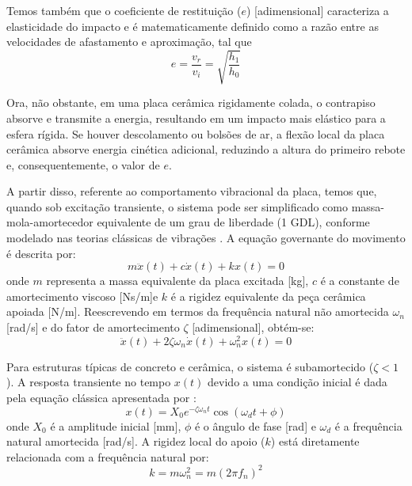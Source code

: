 \documentclass[10pt,twocolumn,fleqn]{article}
\begin{document}
	Temos também que o coeficiente de restituição ($e$) [adimensional] caracteriza a elasticidade do impacto e é matematicamente definido como a razão entre as velocidades de afastamento e aproximação, tal que
	\begin{equation}
	e = \frac{v_r}{v_i} = \sqrt{\frac{h_1}{h_0}}
	\end{equation}
	
	Ora, não obstante, em uma placa cerâmica rigidamente colada, o contrapiso absorve e transmite a energia, resultando em um impacto mais elástico para a esfera rígida. Se houver descolamento ou bolsões de ar, a flexão local da placa cerâmica absorve energia cinética adicional, reduzindo a altura do primeiro rebote e, consequentemente, o valor de $e$.
	
	A partir disso, referente ao comportamento vibracional da placa, temos que, quando sob excitação transiente, o sistema pode ser simplificado como massa-mola-amortecedor equivalente de um grau de liberdade (1 GDL), conforme modelado nas teorias clássicas de vibrações \parencite{rao2008vibracoes, thomson2008teoria}. A equação governante do movimento é descrita por:
	\begin{equation}
	m\ddot{x}(t) + c\dot{x}(t) + kx(t) = 0
	\end{equation}
	onde $m$ representa a massa equivalente da placa excitada [kg], $c$ é a constante de amortecimento viscoso [Ns/m]e $k$ é a rigidez equivalente da peça cerâmica apoiada [N/m]. Reescrevendo em termos da frequência natural não amortecida $\omega_n$ [rad/s] e do fator de amortecimento $\zeta$ [adimensional], obtém-se:
	\begin{equation}
	\ddot{x}(t) + 2\zeta\omega_n\dot{x}(t) + \omega_n^2 x(t) = 0
	\end{equation}
	
	Para estruturas típicas de concreto e cerâmica, o sistema é subamortecido ($\zeta < 1$). A resposta transiente no tempo $x(t)$ devido a uma condição inicial é dada pela equação clássica apresentada por \textcite{rao2008vibracoes}:
	\begin{equation}
	x(t) = X_0 e^{-\zeta\omega_n t}\cos(\omega_d t + \phi)
	\end{equation}
	onde $X_0$ é a amplitude inicial [mm], $\phi$ é o ângulo de fase [rad] e $\omega_d$ é a frequência natural amortecida [rad/s]. A rigidez local do apoio ($k$) está diretamente relacionada com a frequência natural por:
	\begin{equation}
	k = m \omega_n^2 = m (2\pi f_n)^2
	\end{equation}
	
\end{document}
